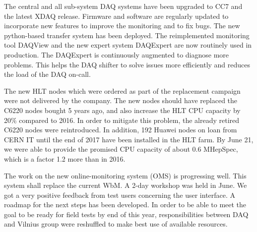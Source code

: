 The central and all sub-system DAQ systems have been upgraded to CC7 and the latest XDAQ release. Firmware and software are regularly updated to incorporate new features to improve the monitoring and to fix bugs. The new python-based transfer system has been deployed. The reimplemented monitoring tool DAQView and the new expert system DAQExpert are now routinely used in production. The DAQExpert is continuously augmented to diagnose more problems. This helps the DAQ shifter to solve issues more efficiently and reduces the load of the DAQ on-call.

The new HLT nodes which were ordered as part of the replacement campaign were not delivered by the company. The new nodes should have replaced the C6220 nodes bought 5 years ago, and also increase the HLT CPU capacity by 20\% compared to 2016. In order to mitigate this problem, the already retired C6220 nodes were reintroduced. In addition, 192 Huawei nodes on loan from CERN IT until the end of 2017 have been installed in the HLT farm. By June 21, we were able to provide the promised CPU capacity of about 0.6 MHepSpec, which is a factor 1.2 more than in 2016.

The work on the new online-monitoring system (OMS) is progressing well. This system shall replace the current WbM. A 2-day workshop was held in June. We got a very positive feedback from test users concerning the user interface. A roadmap for the next steps has been developed. In order to be able to meet the goal to be ready for field tests by end of this year, responsibilities between DAQ and Vilnius group were reshuffled to make best use of available resources.

